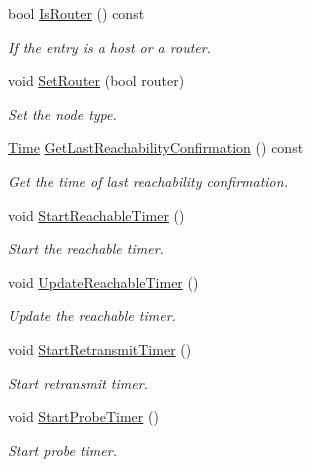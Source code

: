 \begin{DoxyCompactItemize}
bool \hyperlink{classns3_1_1NdiscCache_1_1Entry_a02a6d8d110f15599810e304b83ae32dc}{Is\+Router} () const 
\begin{DoxyCompactList}\small\item\em If the entry is a host or a router. \end{DoxyCompactList}\item 
void \hyperlink{classns3_1_1NdiscCache_1_1Entry_ad45ee53e7bfc3dc68586273590a896cd}{Set\+Router} (bool router)
\begin{DoxyCompactList}\small\item\em Set the node type. \end{DoxyCompactList}\item 
\hyperlink{classns3_1_1Time}{Time} \hyperlink{classns3_1_1NdiscCache_1_1Entry_a58626a92112b59f570f81fe3b1606940}{Get\+Last\+Reachability\+Confirmation} () const 
\begin{DoxyCompactList}\small\item\em Get the time of last reachability confirmation. \end{DoxyCompactList}\item 
void \hyperlink{classns3_1_1NdiscCache_1_1Entry_a41da1f47c98b02babaebc828d780fbfb}{Start\+Reachable\+Timer} ()
\begin{DoxyCompactList}\small\item\em Start the reachable timer. \end{DoxyCompactList}\item 
void \hyperlink{classns3_1_1NdiscCache_1_1Entry_a505d6cca16dc15d1c80e714c10da522f}{Update\+Reachable\+Timer} ()
\begin{DoxyCompactList}\small\item\em Update the reachable timer. \end{DoxyCompactList}\item 
void \hyperlink{classns3_1_1NdiscCache_1_1Entry_a9a9856ca19d04414ed7cc9bf961214d3}{Start\+Retransmit\+Timer} ()
\begin{DoxyCompactList}\small\item\em Start retransmit timer. \end{DoxyCompactList}\item 
void \hyperlink{classns3_1_1NdiscCache_1_1Entry_a3572a37372334f48a76e92d9dfbd128b}{Start\+Probe\+Timer} ()
\begin{DoxyCompactList}\small\item\em Start probe timer. \end{DoxyCompactList}\item 

\end{DoxyCompactItemize}

